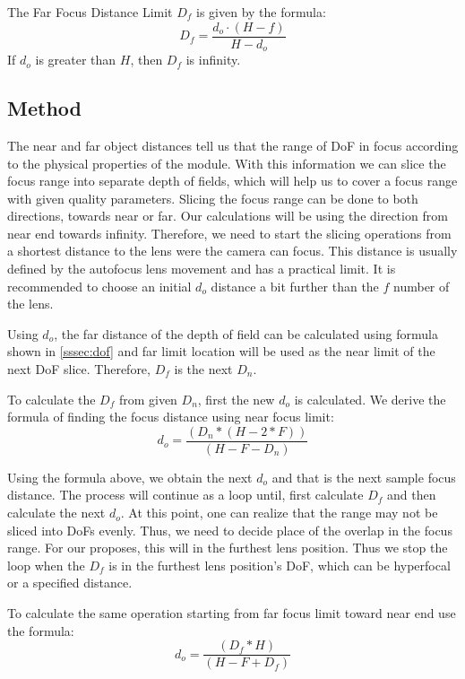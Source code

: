 \documentclass{article}
\begin{document}
The Far Focus Distance Limit \( D_f \) is given by the formula:
\[
D_f = \frac{d_o \cdot (H-f)}{H - d_o}
\]
If \( d_o \) is greater than \( H \), then \( D_f \) is infinity.


\subsection{Method}
\label{sec:method}

The near and far object distances tell us that the range of DoF in focus according to the physical properties of the module. With this information we can slice the focus range into separate depth of fields, which will help us to cover a focus range with given quality parameters.  Slicing the focus range can be done to both directions, towards near or far.  Our calculations will be using the direction from near end towards infinity. Therefore, we need to start the slicing operations from a shortest distance to the lens were the camera can focus. This distance is usually defined by the autofocus lens movement and has a practical limit. It is recommended to choose an initial \( d_o \) distance a bit further than the \( f \) number of the lens. 

Using \( d_o \), the far distance of the depth of field can be calculated using formula shown in \ref{sssec:dof} and far limit location will be used as the near limit of the next DoF slice. Therefore, \( D_f \) is the next \( D_n \).

To calculate the \( D_f \) from given \( D_n \), first the new \( d_o \) is calculated.
We derive the formula of finding the focus distance using near focus limit: 
\[
d_o =  \frac{(D_n * (H - 2 * F))}{(H - F - D_n)}
\]

Using the formula above, we obtain the next \( d_o \) and that is the next sample focus distance. The process will continue as a loop until, first calculate \( D_f \) and then calculate the next \( d_o \). At this point, one can realize that the range may not be sliced into DoFs evenly. Thus, we need to decide place of the overlap in the focus range. For our proposes, this will in the furthest lens position. Thus we stop the loop when the  \( D_f \) is in the furthest lens position's DoF, which can be hyperfocal or a specified distance. 

To calculate the same operation starting from far focus limit toward near end use the formula:
\[
d_o =  \frac{(D_f * H)}{(H - F + D_f)}
\]
\end{document}
